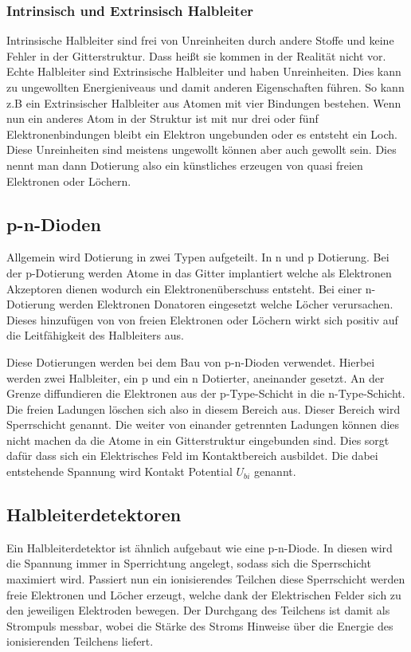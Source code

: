 \subsubsection{Intrinsisch und Extrinsisch Halbleiter}
Intrinsische Halbleiter sind frei von Unreinheiten durch andere Stoffe und keine Fehler in der Gitterstruktur. Dass heißt sie kommen in der Realität nicht vor. Echte Halbleiter sind Extrinsische Halbleiter und haben Unreinheiten. Dies kann zu ungewollten Energieniveaus und damit anderen Eigenschaften führen. So kann z.B ein Extrinsischer Halbleiter aus Atomen mit vier Bindungen bestehen. Wenn nun ein anderes Atom in der Struktur ist mit nur drei oder fünf Elektronenbindungen bleibt ein Elektron ungebunden oder es entsteht ein Loch. Diese Unreinheiten sind meistens ungewollt können aber auch gewollt sein. Dies nennt man dann Dotierung also ein künstliches erzeugen von quasi freien Elektronen oder Löchern.
\subsection{p-n-Dioden}
Allgemein wird Dotierung in zwei Typen aufgeteilt. In n und p Dotierung. Bei der p-Dotierung werden Atome in das Gitter implantiert welche als Elektronen Akzeptoren dienen wodurch ein Elektronenüberschuss entsteht. Bei einer n-Dotierung werden Elektronen Donatoren eingesetzt welche Löcher verursachen. Dieses hinzufügen von von freien Elektronen oder Löchern wirkt sich positiv auf die Leitfähigkeit des Halbleiters aus.\par
Diese Dotierungen werden bei dem Bau von p-n-Dioden verwendet. Hierbei werden zwei Halbleiter, ein p und ein n Dotierter, aneinander gesetzt. An der Grenze diffundieren die Elektronen aus der p-Type-Schicht in die n-Type-Schicht. Die freien Ladungen löschen sich also in diesem Bereich aus. Dieser Bereich wird Sperrschicht genannt. Die weiter von einander getrennten Ladungen können dies nicht machen da die Atome in ein Gitterstruktur eingebunden sind. Dies sorgt dafür dass sich ein Elektrisches Feld im Kontaktbereich ausbildet. Die dabei entstehende Spannung wird Kontakt Potential $U_{bi}$ genannt.  
\subsection{Halbleiterdetektoren}
Ein Halbleiterdetektor ist ähnlich aufgebaut wie eine p-n-Diode. In diesen wird die Spannung immer in Sperrichtung angelegt, sodass sich die Sperrschicht maximiert wird. Passiert nun ein ionisierendes Teilchen diese Sperrschicht werden freie Elektronen und Löcher erzeugt, welche dank der Elektrischen Felder sich zu den jeweiligen Elektroden bewegen. Der Durchgang des Teilchens ist damit als Strompuls messbar, wobei die Stärke des Stroms Hinweise über die Energie des ionisierenden Teilchens liefert.